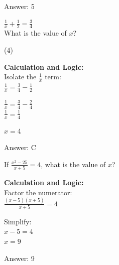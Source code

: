 \documentclass[11pt,paper=a4,answers]{exam}
\begin{document}
\begin{questions}
\begin{solution}
\vspace{25pt}

Answer: \colorbox{yellow!100}{5}
\end{solution}

\vspace{40pt}

\question
$\frac{1}{x} + \frac{1}{2} = \frac{3}{4}$ \\
What is the value of $x$?
\begin{tasks}(4)
\end{tasks}

\begin{solution}
\textbf{Calculation and Logic:} \\
Isolate the $\frac{1}{x}$ term: \\
$\frac{1}{x} = \frac{3}{4} - \frac{1}{2}$

\vspace{10pt}

$\frac{1}{x} = \frac{3}{4} - \frac{2}{4}$ \\
$\frac{1}{x} = \frac{1}{4}$

\vspace{10pt}

$x = 4$

\vspace{25pt}

Answer: \colorbox{yellow!100}{C}
\end{solution}

\vspace{40pt}

\question
If $\frac{x^2 - 25}{x + 5} = 4$, what is the value of $x$?

\begin{solution}
\textbf{Calculation and Logic:} \\
Factor the numerator: \\
$\frac{(x-5)(x+5)}{x+5} = 4$

\vspace{10pt}

Simplify: \\
$x - 5 = 4$ \\
$x = 9$

\vspace{25pt}

Answer: \colorbox{yellow!100}{9}
\end{solution}


\end{questions}
\end{document}
